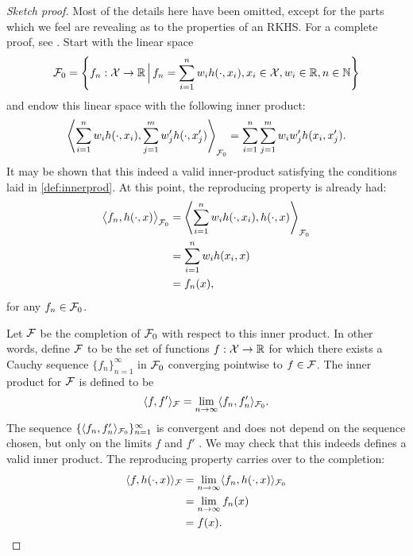 \begin{proof}[Sketch proof]
  Most of the details here have been omitted, except for the parts which we feel are revealing as to the properties of an RKHS.
  For a complete proof, see \citet{berlinet2011reproducing}. 
  Start with the linear space
  \[
    {\mathcal F}_0 = \left\{ f_n:{\mathcal X}\to\mathbb{R} \, \Big| \, f_n = \sum_{i=1}^n w_i h(\cdot,x_i), x_i\in{\mathcal X}, w_i\in\mathbb{R}, n\in\mathbb{N} \right\}
  \]
  and endow this linear space with the following inner product:
  \[\label{eq:rkhsinnerprod}
    \left\langle \sum_{i=1}^n w_i h(\cdot,x_i), \sum_{j=1}^m w_j' h(\cdot,x_j') \right\rangle_{{\mathcal F}_0} = \sum_{i=1}^n\sum_{j=1}^m w_i w_j' h(x_i,x_j').
  \]
  It may be shown that this indeed a valid inner-product satisfying the conditions laid in \cref{def:innerprod}.
  At this point, the reproducing property is already had:   \begin{align*}
    \big\langle f_n, h(\cdot,x) \big\rangle_{{\mathcal F}_0} 
    &= \left\langle \sum_{i=1}^n w_i h(\cdot,x_i), h(\cdot,x) \right\rangle_{{\mathcal F}_0} \\
    &= \sum_{i=1}^n w_i h(x_i,x) \\
    &= f_n(x),
  \end{align*}
  for any $f_n\in{\mathcal F}_0$.
  
  Let ${\mathcal F}$ be the completion of ${\mathcal F}_0$ with respect to this inner product.
  In other words, define ${\mathcal F}$ to be the set of functions $f:{\mathcal X}\to\mathbb{R}$ for which there exists a Cauchy sequence $\{f_n\}_{n=1}^\infty$ in ${\mathcal F}_0$ converging pointwise to $f \in {\mathcal F}$.
  The inner product for ${\mathcal F}$ is defined to be
  \[
    \langle f,f'\rangle_{\mathcal F} = \lim_{n\to\infty} \langle f_n,f_n'\rangle_{{\mathcal F}_0}.
  \]
  The sequence $\{ \langle f_n,f_n'\rangle_{{\mathcal F}_0} \}_{n=1}^\infty$ is convergent and does not depend on the sequence chosen, but only on the limits $f$ and $f'$ \citep[Lemma 5]{berlinet2011reproducing}.
  We may check that this indeeds defines a valid inner product.
  The reproducing property carries over to the completion:
  \begin{align*}
    \langle f,h(\cdot,x)\rangle_{\mathcal F} 
    &= \lim_{n\to\infty} \langle f_n,h(\cdot,x)\rangle_{{\mathcal F}_0} \\
    &= \lim_{n\to\infty} f_n(x) \\
    &= f(x).
  \end{align*}
  

\end{proof}
